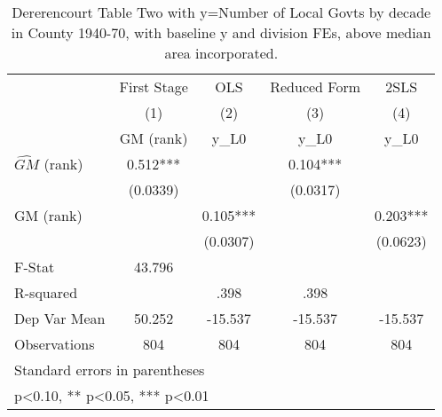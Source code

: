 \begin{table}[htbp]\centering
\def\sym#1{\ifmmode^{#1}\else\(^{#1}\)\fi}
\caption{Dererencourt Table Two with y=Number of Local Govts by decade in County 1940-70, with baseline y and division FEs, above median area incorporated.}
\begin{tabular}{l*{4}{c}}
\toprule
                    & First Stage   &         OLS   &Reduced Form   &        2SLS   \\
                    &\multicolumn{1}{c}{(1)}&\multicolumn{1}{c}{(2)}&\multicolumn{1}{c}{(3)}&\multicolumn{1}{c}{(4)}\\
                    &\multicolumn{1}{c}{GM  (rank)}&\multicolumn{1}{c}{y\_L0}&\multicolumn{1}{c}{y\_L0}&\multicolumn{1}{c}{y\_L0}\\
\midrule
$\hat{GM}$ (rank)   &       0.512***&               &       0.104***&               \\
                    &    (0.0339)   &               &    (0.0317)   &               \\
\addlinespace
GM  (rank)          &               &       0.105***&               &       0.203***\\
                    &               &    (0.0307)   &               &    (0.0623)   \\
\midrule
F-Stat              &      43.796   &               &               &               \\
R-squared           &               &        .398   &        .398   &               \\
Dep Var Mean        &      50.252   &     -15.537   &     -15.537   &     -15.537   \\
Observations        &         804   &         804   &         804   &         804   \\
\bottomrule
\multicolumn{5}{l}{\footnotesize Standard errors in parentheses}\\
\multicolumn{5}{l}{\footnotesize * p<0.10, ** p<0.05, *** p<0.01}\\
\end{tabular}
\end{table}
